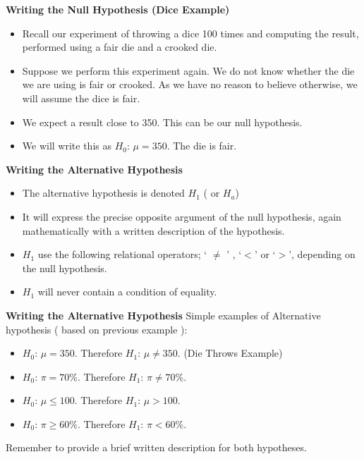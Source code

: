 
\noindent \textbf{Writing the Null Hypothesis (Dice Example)}

\begin{itemize}
\item Recall our experiment of throwing a dice 100 times and computing the result, performed using a fair die and a crooked die.
\item Suppose we perform this experiment again. We do not know whether the die we are using is fair or crooked. As we have no reason to believe otherwise, we will assume the dice is fair.
    \item We expect a result close to 350. This can be our null hypothesis.
\item We will write this as $H_0$:  $\mu = 350$. The die is fair.
\end{itemize}


{
\noindent \textbf{Writing the Alternative Hypothesis}
\begin{itemize}
\item The alternative hypothesis is denoted $H_1$ ( or $H_a$)
\item It will express the precise opposite argument of the null hypothesis, again mathematically with a written description of the hypothesis.
\item $H_1$ use the following relational operators; ` $\neq$ ' , `$<$' or `$>$', depending on the null hypothesis.
\item $H_1$ will never contain a condition of equality.
\end{itemize}
}
{
\noindent \textbf{Writing the Alternative Hypothesis}
Simple examples of Alternative hypothesis ( based on previous example ):
\begin{itemize}
\item $H_0$:  $\mu = 350$.  Therefore  $H_1$:  $\mu \neq 350$. (Die Throws Example)
\item $H_0$:  $\pi = 70\%$. Therefore  $H_1$:  $\pi \neq 70\%$.
\item $H_0$:  $\mu \leq 100$. Therefore  $H_1$:  $\mu > 100$.
\item $H_0$:  $\pi \geq 60\%$. Therefore  $H_1$:  $\pi < 60\%$.
\end{itemize}
Remember to provide a brief written description for both hypotheses.
}

